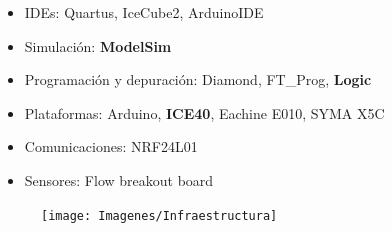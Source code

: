 \documentclass[a4,landscpae]{seminar}
\begin{document}
\begin{hslide}
\begin{minipage}{6.5cm}
	\begin{itemize}
		\item IDEs: Quartus, IceCube2, ArduinoIDE
		\item Simulaci\'on: \textbf{ModelSim}
		\item Programaci\'on y depuraci\'on: Diamond, FT\_Prog, \textbf{Logic}
	\end{itemize}
	\begin{itemize}
		\item Plataformas: Arduino, \textbf{ICE40}, Eachine E010, SYMA X5C
		\item Comunicaciones: NRF24L01
		\item Sensores: Flow breakout board

	\end{itemize}
\end{minipage} \hfill
\begin{minipage}{4cm}
	\begin{figure}
		\texttt{[image: Imagenes/Infraestructura]}
	\end{figure}
\end{minipage} \hfill
\end{hslide}
\end{document}
